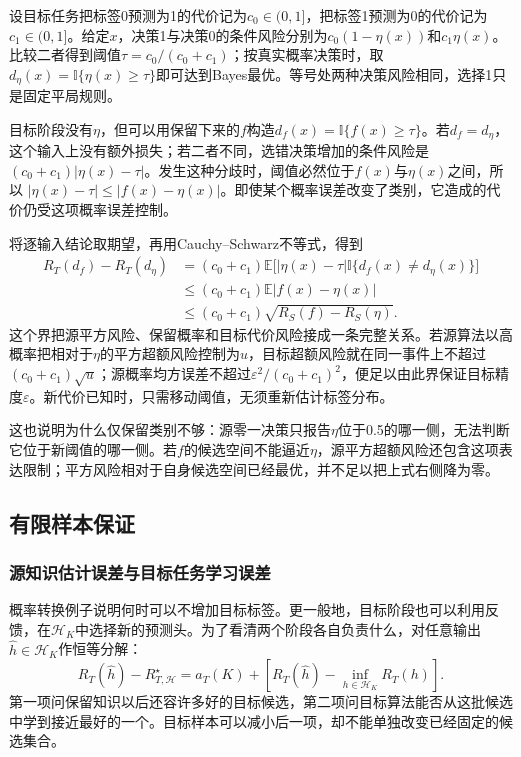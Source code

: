 设目标任务把标签0预测为1的代价记为$c_0\in(0,1]$，把标签1预测为0的代价记为$c_1\in(0,1]$。给定$x$，决策1与决策0的条件风险分别为$c_0(1-\eta(x))$和$c_1\eta(x)$。比较二者得到阈值$\tau=c_0/(c_0+c_1)$；按真实概率决策时，取$d_\eta(x)=\mathbb I\{\eta(x)\geq\tau\}$即可达到Bayes最优。等号处两种决策风险相同，选择1只是固定平局规则。

目标阶段没有$\eta$，但可以用保留下来的$f$构造$d_f(x)=\mathbb I\{f(x)\geq\tau\}$。若$d_f=d_\eta$，这个输入上没有额外损失；若二者不同，选错决策增加的条件风险是
$(c_0+c_1)|\eta(x)-\tau|$。发生这种分歧时，阈值必然位于$f(x)$与$\eta(x)$之间，所以
$|\eta(x)-\tau|\leq|f(x)-\eta(x)|$。即使某个概率误差改变了类别，它造成的代价仍受这项概率误差控制。

将逐输入结论取期望，再用Cauchy--Schwarz不等式，得到
\begin{align*}
 R_T(d_f)-R_T(d_\eta)
 &= (c_0+c_1)\mathbb E\bigl[|\eta(x)-\tau|
       \mathbb I\{d_f(x)\neq d_\eta(x)\}\bigr] \\
 &\leq(c_0+c_1)\mathbb E|f(x)-\eta(x)| \\
 &\leq(c_0+c_1)\sqrt{R_S(f)-R_S(\eta)}.
\end{align*}
这个界把源平方风险、保留概率和目标代价风险接成一条完整关系。若源算法以高概率把相对于$\eta$的平方超额风险控制为$u$，目标超额风险就在同一事件上不超过$(c_0+c_1)\sqrt u$；源概率均方误差不超过$\varepsilon^2/(c_0+c_1)^2$，便足以由此界保证目标精度$\varepsilon$。新代价已知时，只需移动阈值，无须重新估计标签分布。

这也说明为什么仅保留类别不够：源零一决策只报告$\eta$位于0.5的哪一侧，无法判断它位于新阈值的哪一侧。若$f$的候选空间不能逼近$\eta$，源平方超额风险还包含这项表达限制；平方风险相对于自身候选空间已经最优，并不足以把上式右侧降为零。

\subsection{有限样本保证}

\subsubsection{源知识估计误差与目标任务学习误差}

概率转换例子说明何时可以不增加目标标签。更一般地，目标阶段也可以利用反馈，在$\mathcal H_K$中选择新的预测头。为了看清两个阶段各自负责什么，对任意输出$\widehat h\in\mathcal H_K$作恒等分解：
\[
 R_T(\widehat h)-R_{T,\mathcal H}^{\star}
 =a_T(K)+\left[R_T(\widehat h)
       -\inf_{h\in\mathcal H_K}R_T(h)\right].
\]
第一项问保留知识以后还容许多好的目标候选，第二项问目标算法能否从这批候选中学到接近最好的一个。目标样本可以减小后一项，却不能单独改变已经固定的候选集合。


